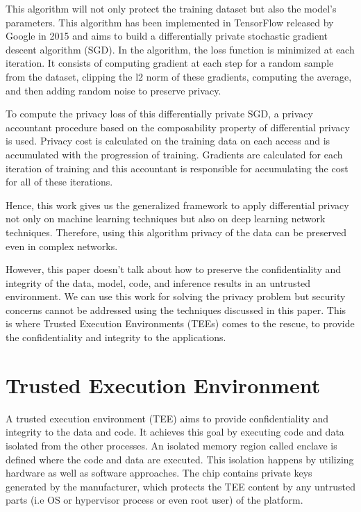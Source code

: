 This algorithm will not only protect the training dataset but also the model’s parameters. This algorithm has been implemented in TensorFlow \cite{46} released by Google in 2015 and aims to build a differentially private stochastic gradient descent algorithm (SGD). In the algorithm, the loss function is minimized at each iteration. It consists of computing gradient at each step for a random sample from the dataset, clipping the l2 norm of these gradients, computing the average, and then adding random noise to preserve privacy. 

To compute the privacy loss of this differentially private SGD, a privacy accountant \cite{49} procedure based on the composability property of differential privacy is used. Privacy cost is calculated on the training data on each access and is accumulated with the progression of training. Gradients are calculated for each iteration of training and this accountant is responsible for accumulating the cost for all of these iterations.

Hence, this work gives us the generalized framework to apply differential privacy not only on machine learning techniques but also on deep learning network techniques. Therefore, using this algorithm privacy of the data can be preserved even in complex networks. 

However, this paper doesn't talk about how to preserve the confidentiality and integrity of the data, model, code, and inference results in an untrusted environment. We can use this work for solving the privacy problem but security concerns cannot be addressed using the techniques discussed in this paper. This is where Trusted Execution Environments (TEEs) comes to the rescue, to provide the confidentiality and integrity to the applications.

\section{Trusted Execution Environment}
A trusted execution environment (TEE) \cite{59} aims to provide confidentiality and integrity to the data and code. It achieves this goal by executing code and data isolated from the other processes. An isolated memory region called enclave is defined where the code and data are executed. This isolation happens by utilizing hardware as well as software approaches. The chip contains private keys generated by the manufacturer, which protects the TEE content by any untrusted parts (i.e OS or hypervisor process or even root user) of the platform. 

